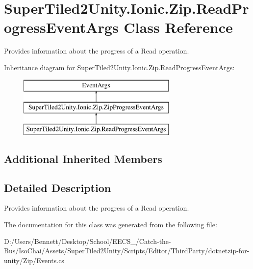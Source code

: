 \hypertarget{class_super_tiled2_unity_1_1_ionic_1_1_zip_1_1_read_progress_event_args}{}\section{Super\+Tiled2\+Unity.\+Ionic.\+Zip.\+Read\+Progress\+Event\+Args Class Reference}
\label{class_super_tiled2_unity_1_1_ionic_1_1_zip_1_1_read_progress_event_args}


Provides information about the progress of a Read operation.  


Inheritance diagram for Super\+Tiled2\+Unity.\+Ionic.\+Zip.\+Read\+Progress\+Event\+Args\+:\begin{figure}[H]
\begin{center}
\leavevmode
\includegraphics[height=3.000000cm]{class_super_tiled2_unity_1_1_ionic_1_1_zip_1_1_read_progress_event_args}
\end{center}
\end{figure}
\subsection*{Additional Inherited Members}


\subsection{Detailed Description}
Provides information about the progress of a Read operation. 



The documentation for this class was generated from the following file\+:\begin{DoxyCompactItemize}
\item 
D\+:/\+Users/\+Bennett/\+Desktop/\+School/\+E\+E\+C\+S\+\_/\+Catch-\/the-\/\+Bus/\+Iso\+Chai/\+Assets/\+Super\+Tiled2\+Unity/\+Scripts/\+Editor/\+Third\+Party/dotnetzip-\/for-\/unity/\+Zip/Events.\+cs\end{DoxyCompactItemize}

